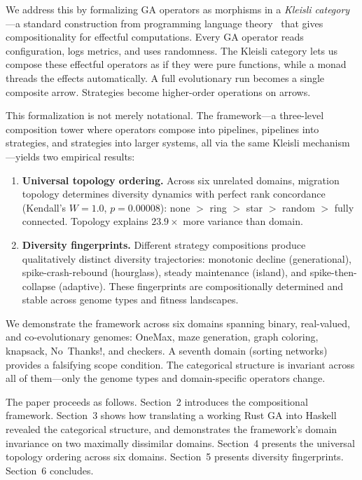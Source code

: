 \documentclass[dvipsnames,format=sigconf,anonymous=true,review=false]{acmart}
\begin{document}
We address this by formalizing GA operators as morphisms in a \emph{Kleisli category}---a standard construction from programming language theory~\cite{moggi1991notions} that gives compositionality for effectful computations. Every GA operator reads configuration, logs metrics, and uses randomness. The Kleisli category lets us compose these effectful operators as if they were pure functions, while a monad threads the effects automatically. A full evolutionary run becomes a single composite arrow. Strategies become higher-order operations on arrows.

This formalization is not merely notational. The framework---a three-level composition tower where operators compose into pipelines, pipelines into strategies, and strategies into larger systems, all via the same Kleisli mechanism---yields two empirical results:

\begin{enumerate}[nosep]
  \item \textbf{Universal topology ordering.} Across six unrelated domains, migration topology determines diversity dynamics with perfect rank concordance (Kendall's $W = 1.0$, $p = 0.00008$): none $>$ ring $>$ star $>$ random $>$ fully connected. Topology explains $23.9\times$ more variance than domain.

  \item \textbf{Diversity fingerprints.} Different strategy compositions produce qualitatively distinct diversity trajectories: monotonic decline (generational), spike-crash-rebound (hourglass), steady maintenance (island), and spike-then-collapse (adaptive). These fingerprints are compositionally determined and stable across genome types and fitness landscapes.
\end{enumerate}

We demonstrate the framework across six domains spanning binary, real-valued, and co-evolutionary genomes: OneMax, maze generation, graph coloring, knapsack, No~Thanks!, and checkers. A seventh domain (sorting networks) provides a falsifying scope condition. The categorical structure is invariant across all of them---only the genome types and domain-specific operators change.

The paper proceeds as follows. Section~2 introduces the compositional framework. Section~3 shows how translating a working Rust GA into Haskell revealed the categorical structure, and demonstrates the framework's domain invariance on two maximally dissimilar domains. Section~4 presents the universal topology ordering across six domains. Section~5 presents diversity fingerprints. Section~6 concludes.
\end{document}

